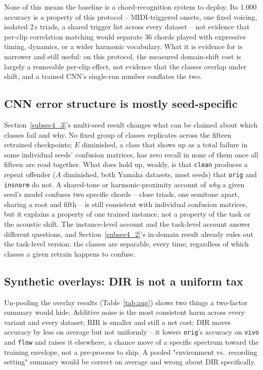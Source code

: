 \documentclass[pdflatex,sn-mathphys-num,iicol]{sn-jnl}
\theoremstyle{thmstyleone}
\theoremstyle{thmstyletwo}
\theoremstyle{thmstylethree}
\begin{document}
None of this means the baseline is a chord-recognition system to deploy. Its 1.000 accuracy is a property of this protocol -- MIDI-triggered onsets, one fixed voicing, isolated 2\,s triads, a shared trigger list across every dataset -- not evidence that per-clip correlation matching would separate 36 chords played with expressive timing, dynamics, or a wider harmonic vocabulary. What it is evidence for is narrower and still useful: on this protocol, the measured domain-shift cost is largely a removable per-clip effect, not evidence that the classes overlap under shift, and a trained CNN's single-run number conflates the two.

\subsection{CNN error structure is mostly seed-specific}\label{subsec5_1}

Section~\ref{subsec4_3}'s multi-seed result changes what can be claimed about which classes fail and why. No fixed group of classes replicates across the fifteen retrained checkpoints; $E$ diminished, a class that shows up as a total failure in some individual seeds' confusion matrices, has zero recall in none of them once all fifteen are read together. What does hold up, weakly, is that \texttt{clean} produces a repeat offender ($A$ diminished, both Yamaha datasets, most seeds) that \texttt{orig} and \texttt{insnorm} do not. A shared-tone or harmonic-proximity account of \emph{why} a given seed's model confuses two specific chords -- close triads, one semitone apart, sharing a root and fifth -- is still consistent with individual confusion matrices, but it explains a property of one trained instance, not a property of the task or the acoustic shift. The instance-level account and the task-level account answer different questions, and Section~\ref{subsec4_2}'s in-domain result already rules out the task-level version: the classes are separable, every time, regardless of which classes a given retrain happens to confuse.

\subsection{Synthetic overlays: DIR is not a uniform tax}\label{subsec5_2}

Un-pooling the overlay results (Table~\ref{tab:aug}) shows two things a two-factor summary would hide. Additive noise is the most consistent harm across every variant and every dataset; RIR is smaller and still a net cost; DIR moves accuracy by less on average but not uniformly -- it lowers \texttt{orig}'s accuracy on \texttt{vivo} and \texttt{flow} and raises it elsewhere, a chance move of a specific spectrum toward the training envelope, not a pre-process to ship. A pooled "environment vs.\ recording setting" summary would be correct on average and wrong about DIR specifically.
\end{document}
